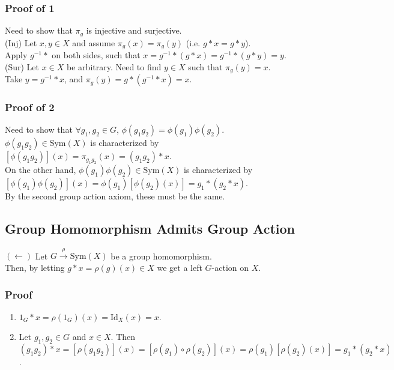 \documentclass[11pt]{article}
\newcommand{\0}{\emptyset}
\begin{document}
\subsubsection*{Proof of 1}
\label{sec:org3c5d87f}
Need to show that \(\pi_{g}\) is injective and surjective.\\[0pt]
(Inj) Let \(x,y\in X\) and assume \(\pi_{g}(x)=\pi_{g}(y)\) (i.e. \(g*x=g*y\)).\\[0pt]
Apply \(g^{-1}*\) on both sides, such that \(x=g^{-1}*(g*x)=g^{-1}*(g*y)=y\).\\[0pt]
(Sur) Let \(x\in X\) be arbitrary. Need to find \(y\in X\) such that \(\pi_{g}(y)=x\).\\[0pt]
Take \(y=g^{-1}*x\), and \(\pi_{g}(y)=g*(g^{-1}*x)=x\).\\[0pt]
\subsubsection*{Proof of 2}
\label{sec:org8ee093d}
Need to show that \(\forall g_{1},g_{2}\in G\), \(\phi(g_{1}g_{2})=\phi(g_{1})\phi(g_{2})\).\\[0pt]
\(\phi(g_{1}g_{2})\in\text{Sym}(X)\) is characterized by \([\phi(g_{1}g_{2})](x)=\pi_{g_{1}g_{2}}(x)=(g_{1}g_{2})*x\).\\[0pt]
On the other hand, \(\phi(g_{1})\phi(g_{2})\in\text{Sym}(X)\) is characterized by \([\phi(g_{1})\phi(g_{2})](x)=\phi(g_{1})[\phi(g_{2})(x)]=g_{1}*(g_{2}*x)\).\\[0pt]
By the second group action axiom, these must be the same.\\[0pt]
\subsection*{Group Homomorphism Admits Group Action}
\label{sec:org1677ef0}
\((\longleftarrow)\) Let \(G\overset{\rho}{\to}\text{Sym}(X)\) be a group homomorphism.\\[0pt]
Then, by letting \(g*x=\rho(g)(x)\in X\) we get a left \(G\)-action on \(X\).\\[0pt]
\subsubsection*{Proof}
\label{sec:org1ba6a32}
\begin{enumerate}
\item \(1_{G}*x=\rho(1_{G})(x)=\text{Id}_{X}(x)=x\).\\[0pt]
\item Let \(g_{1},g_{2}\in G\) and \(x\in X\). Then \((g_{1}g_{2})*x=[\rho(g_{1}g_{2})](x)=[\rho(g_{1})\circ\rho(g_{2})](x)=\rho(g_{1})[\rho(g_{2})(x)]=g_{1}*(g_{2}*x)\).\\[0pt]
\end{enumerate}
\end{document}
